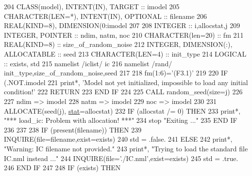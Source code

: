 \begin{DoxyCode}
204     \textcolor{keywordtype}{CLASS}(model), \textcolor{keywordtype}{INTENT(IN)}, \textcolor{keywordtype}{TARGET} :: imodel
205     \textcolor{keywordtype}{CHARACTER(LEN=*)}, \textcolor{keywordtype}{INTENT(IN)}, \textcolor{keywordtype}{OPTIONAL} :: filename
206     \textcolor{keywordtype}{REAL(KIND=8)}, \textcolor{keywordtype}{DIMENSION(0:imodel%
207 
208     \textcolor{keywordtype}{INTEGER} :: i,allocstat,j
209     \textcolor{keywordtype}{INTEGER}, \textcolor{keywordtype}{POINTER} :: ndim, natm, noc
210     \textcolor{keywordtype}{CHARACTER(len=20)} :: fm
211     \textcolor{keywordtype}{REAL(KIND=8)} :: size\_of\_random\_noise
212     \textcolor{keywordtype}{INTEGER}, \textcolor{keywordtype}{DIMENSION(:)}, \textcolor{keywordtype}{ALLOCATABLE} :: seed
213     \textcolor{keywordtype}{CHARACTER(LEN=4)} :: init\_type
214     \textcolor{keywordtype}{LOGICAL} :: exists, std
215     namelist /iclist/ ic
216     namelist /rand/ init\_type,size\_of\_random\_noise,seed
217 
218     fm(1:6)=\textcolor{stringliteral}{'(F3.1)'}
219 
220     \textcolor{keywordflow}{IF} (.NOT.imodel%
221       print*, \textcolor{stringliteral}{'Model not yet initialized, impossible to load any initial condition!'}
222       \textcolor{keywordflow}{RETURN}
223 \textcolor{keywordflow}{    END IF}
224 
225     \textcolor{keyword}{CALL }random\_seed(size=j)
226 
227     ndim => imodel%
228     natm => imodel%
229     noc => imodel%
230 
231     \textcolor{keyword}{ALLOCATE}(seed(j), \hyperlink{namespacestat}{stat}=allocstat)
232     \textcolor{keywordflow}{IF} (allocstat /= 0) \textcolor{keywordflow}{THEN}
233       print*, \textcolor{stringliteral}{"*** load\_ic: Problem with allocation! ***"}
234       stop \textcolor{stringliteral}{"Exiting ..."}
235 \textcolor{keywordflow}{    END IF}
236 
237 
238     \textcolor{keywordflow}{IF} (\textcolor{keyword}{present}(filename)) \textcolor{keywordflow}{THEN}
239       \textcolor{keyword}{INQUIRE}(file=filename,exist=exists)
240       std = .false.
241     \textcolor{keywordflow}{ELSE}
242       print*, \textcolor{stringliteral}{"Warning: IC filename not provided."}
243       print*, \textcolor{stringliteral}{"Trying to load the standard file IC.nml instead ..."}
244       \textcolor{keyword}{INQUIRE}(file=\textcolor{stringliteral}{'./IC.nml'},exist=exists)
245       std = .true.
246 \textcolor{keywordflow}{    END IF}
247 
248     \textcolor{keywordflow}{IF} (exists) \textcolor{keywordflow}{THEN}
}
\end{DoxyCode}
